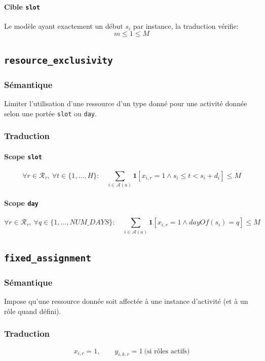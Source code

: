 \documentclass[12pt,a4paper]{article}
\begin{document}
\paragraph{Cible \texttt{slot}}
Le modèle ayant exactement un début \(s_i\) par instance, la traduction vérifie:
\[
m \le 1 \le M
\]

\subsection{\texttt{resource\_exclusivity}}
\subsubsection*{Sémantique}
Limiter l'utilisation d'une ressource d'un type donné pour une activité donnée selon une portée \texttt{slot} ou \texttt{day}.

\subsubsection*{Traduction}
\paragraph{Scope \texttt{slot}}
\[
\forall r\in\mathcal{R}_\tau,\ \forall t\in\{1,\dots,H\}:\quad
\sum_{i\in\mathcal{A}(a)} \mathbf{1}[x_{i,r}=1 \land s_i\le t < s_i+d_i] \le M
\]

\paragraph{Scope \texttt{day}}
\[
\forall r\in\mathcal{R}_\tau,\ \forall q\in\{1,\dots,NUM\_DAYS\}:\quad
\sum_{i\in\mathcal{A}(a)} \mathbf{1}[x_{i,r}=1 \land dayOf(s_i)=q] \le M
\]

\subsection{\texttt{fixed\_assignment}}
\subsubsection*{Sémantique}
Impose qu'une ressource donnée soit affectée à une instance d'activité (et à un rôle quand défini).

\subsubsection*{Traduction}
\[
x_{i,r}=1,\qquad y_{i,k,r}=1\ \text{(si rôles actifs)}
\]
\end{document}
